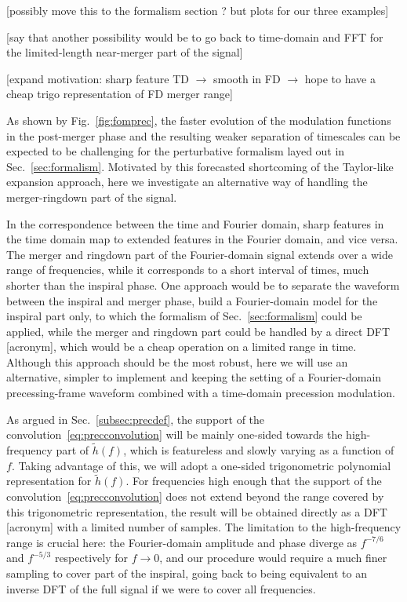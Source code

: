 \documentclass[aps,showpacs,twocolumn,
prd,superscriptaddress,nofootinbib]{revtex4-1}
\newcommand{\SM}[1]{{\color{Red} #1}}
\begin{document}
\SM{[possibly move this to the formalism section ? but plots for our three examples]}

\SM{[say that another possibility would be to go back to time-domain and FFT for the limited-length near-merger part of the signal]}

\SM{[expand motivation: sharp feature TD $\rightarrow$ smooth in FD $\rightarrow$ hope to have a cheap trigo representation of FD merger range]}

As shown by Fig.~\ref{fig:fomprec}, the faster evolution of the modulation functions in the post-merger phase and the resulting weaker separation of timescales can be expected to be challenging for the perturbative formalism layed out in Sec.~\ref{sec:formalism}. Motivated by this forecasted shortcoming of the Taylor-like expansion approach, here we investigate an alternative way of handling the merger-ringdown part of the signal.

In the correspondence between the time and Fourier domain, sharp features in the time domain map to extended features in the Fourier domain, and vice versa. The merger and ringdown part of the Fourier-domain signal extends over a wide range of frequencies, while it corresponds to a short interval of times, much shorter than the inspiral phase. One approach would be to separate the waveform between the inspiral and merger phase, build a Fourier-domain model for the inspiral part only, to which the formalism of Sec.~\ref{sec:formalism} could be applied, while the merger and ringdown part could be handled by a direct DFT \SM{[acronym]}, which would be a cheap operation on a limited range in time. Although this approach should be the most robust, here we will use an alternative, simpler to implement and keeping the setting of a Fourier-domain precessing-frame waveform combined with a time-domain precession modulation.

As argued in Sec.~\ref{subsec:precdef}, the support of the convolution~\eqref{eq:precconvolution} will be mainly one-sided towards the high-frequency part of $\tilde{h}(f)$, which is featureless and slowly varying as a function of $f$. Taking advantage of this, we will adopt a one-sided trigonometric polynomial representation for $\tilde{h}(f)$. For frequencies high enough that the support of the convolution~\eqref{eq:precconvolution} does not extend beyond the range covered by this trigonometric representation, the result will be obtained directly as a DFT \SM{[acronym]} with a limited number of samples. The limitation to the high-frequency range is crucial here: the Fourier-domain amplitude and phase diverge as $f^{-7/6}$ and $f^{-5/3}$ respectively for $f \rightarrow 0$, and our procedure would require a much finer sampling to cover part of the inspiral, going back to being equivalent to an inverse DFT of the full signal if we were to cover all frequencies.
\end{document}
